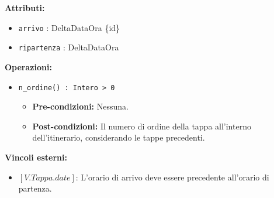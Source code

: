 \documentclass[a4paper]{scrartcl}
\begin{document}
\textbf{Attributi:}
\begin{itemize}
    \item \texttt{arrivo} : DeltaDataOra \{id\}
    \item \texttt{ripartenza} : DeltaDataOra
\end{itemize}

\textbf{Operazioni:}
\begin{itemize}
    \item \texttt{n\_ordine() : Intero > 0}
        \begin{itemize}
            \item \textbf{Pre-condizioni:} Nessuna.
            \item \textbf{Post-condizioni:} Il numero di ordine della tappa all'interno dell'itinerario, considerando le tappe precedenti.
        \end{itemize}
\end{itemize}

\textbf{Vincoli esterni:}
\begin{itemize}
    \item $[V.Tappa.date]$: L'orario di arrivo deve essere precedente all'orario di partenza.
\end{itemize}
\end{document}

